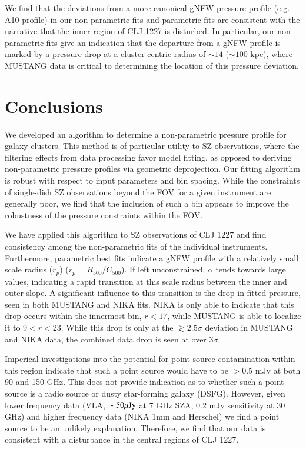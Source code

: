 \documentclass[twocolumn,traditabstract]{aa}
\begin{document}
We find that the deviations from a more canonical gNFW pressure profile (e.g. A10 profile) in our
non-parametric fits and parametric fits are consistent with the narrative that the inner region of
CLJ 1227 is disturbed. In particular, our non-parametric fits give an indication that the departure
from a gNFW profile is marked by a pressure drop at a cluster-centric radius of $\sim 14$\asecs
($\sim 100$ kpc), where MUSTANG data is critical to determining the location of this pressure deviation.


\section{Conclusions}
\label{sec:conclusions}

We developed an algorithm to determine a non-parametric pressure profile for galaxy clusters.
This method is of particular utility to SZ observations, where the filtering effects from data
processing favor model fitting, as opposed to deriving non-parametric pressure profiles via
geometric deprojection. Our fitting algorithm is robust with respect to input parameters and
bin spacing. While the constraints of single-dish SZ observations beyond the FOV for a given
instrument are generally poor, we find that the inclusion of such a bin appears to improve
the robustness of the pressure constraints within the FOV.

We have applied this algorithm to SZ observations of CLJ 1227 and
find consistency among the non-parametric fits of the individual instruments. Furthermore,
parametric best fits indicate a gNFW profile with a relatively small scale radius ($r_p$)
($r_p = R_{500}/C_{500}$). If left unconstrained, $\alpha$ tends towards large values, indicating
a rapid transition at this scale radius between the inner and outer slope. A significant
influence to this transition is the drop in fitted pressure, seen in both MUSTANG and NIKA
fits. NIKA is only able to indicate that this drop occurs within the innermost bin, $r < 17$\asec,
while MUSTANG is able to localize it to $9 < r < 23$\asec. While this drop is only at the
$\gtrsim 2.5 \sigma$ deviation in MUSTANG and NIKA data, the combined data drop is seen at over
$3 \sigma$.

Imperical investigations into the potential for point source contamination within this region
indicate that such a point source would have to be $> 0.5$ mJy at both 90 and 150 GHz. This does
not provide indication as to whether such a point source is a radio source or dusty star-forming
galaxy (DSFG). However, given lower frequency data (VLA, $\sim 50 {\rm \mu Jy}$ at 7 GHz
SZA, 0.2 mJy sensitivity at 30 GHz) and higher frequency data
(NIKA 1mm and Herschel) we find a point source to be an unlikely explanation. Therefore,
we find that our data is consistent with a disturbance in the central regions of CLJ 1227.
\end{document}
